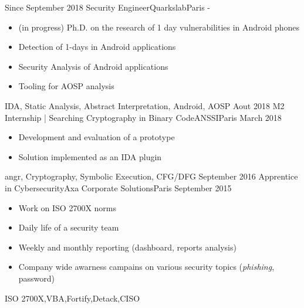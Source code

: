 

\begin{experiences}
  \experience
  {Since September 2018} {Security Engineer}{Quarkslab}{Paris}
  {-}{
    \begin{itemize}[topsep=0pt,itemsep=1ex,partopsep=0ex,parsep=0ex]
      \item (in progress) Ph.D. on the research of 1 day vulnerabilities in Android phones
      \item Detection of 1-days in Android applications
      \item Security Analysis of Android applications
      \item Tooling for AOSP analysis
    \end{itemize}
  }
  { IDA, Static Analysis, Abstract Interpretation, Android, AOSP}
  \emptySeparator
  \experience
    {Aout 2018}   {M2 Internship | Searching Cryptography in Binary Code}{ANSSI}{Paris}
    {March 2018} {
                      \begin{itemize}[topsep=0pt,itemsep=1ex,partopsep=0ex,parsep=0ex]
                        \item Development and evaluation of a prototype
                        \item Solution implemented as an IDA plugin
                      \end{itemize}
                    }
                    {angr, Cryptography, Symbolic Execution, CFG/DFG}
  \emptySeparator
  \experience
    {September 2016} {Apprentice in Cybersecurity}{Axa Corporate Solutions}{Paris}
    {September 2015}    {
                      \begin{itemize}[topsep=0pt,itemsep=1ex,partopsep=0ex,parsep=0ex]
                        \item Work on ISO 2700X norms
                        \item Daily life of a security team
                        \item Weekly and monthly reporting (dashboard, reports analysis)
                        \item Company wide awarness campains on various security topics (\emph{phishing}, password)
                      \end{itemize}
                    }
                    {ISO 2700X,VBA,Fortify,Detack,CISO}
\end{experiences}
